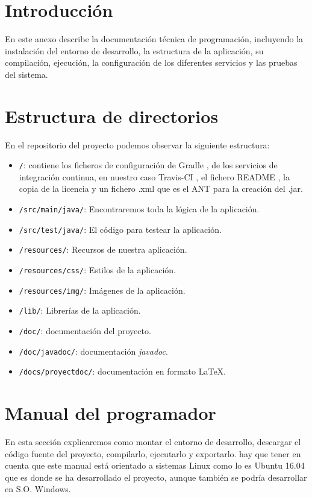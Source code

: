 
\section{Introducción}

En este anexo describe la documentación técnica de programación,
incluyendo la instalación del entorno de desarrollo, la estructura de la
aplicación, su compilación, ejecución, la configuración de los diferentes servicios y las pruebas del sistema.

\section{Estructura de directorios}

En el repositorio del proyecto podemos observar la siguiente estructura:

\begin{itemize}
	\tightlist
	\item
	\texttt{/}: contiene los ficheros de configuración de Gradle \cite{gradle}, de los servicios de integración continua, en nuestro caso Travis-CI \cite{web:travis}, el fichero README , la copia de la
	licencia y un fichero .xml que es el ANT para la creación del .jar.
	\item
	\texttt{/src/main/java/}: Encontraremos toda la lógica de la aplicación.
	\item
	\texttt{/src/test/java/}: El código para testear la aplicación.
	\item
	\texttt{/resources/}: Recursos de nuestra aplicación.
	\item
	\texttt{/resources/css/}: Estilos de la aplicación.
	\item
	\texttt{/resources/img/}: Imágenes de la aplicación.
	\item
	\texttt{/lib/}: Librerías de la aplicación.
	\item
	\texttt{/doc/}: documentación del proyecto.
	\item
	\texttt{/doc/javadoc/}: documentación \emph{javadoc}.
	\item
	\texttt{/docs/proyectdoc/}: documentación en formato \LaTeX.
\end{itemize}

\section{Manual del programador}

En esta sección explicaremos como montar el entorno de desarrollo, descargar el código fuente del proyecto, compilarlo, ejecutarlo y exportarlo. hay que tener en cuenta que este manual está orientado a sistemas Linux como lo es Ubuntu 16.04 que es donde se ha desarrollado el proyecto, aunque también se podría desarrollar en S.O. Windows.

